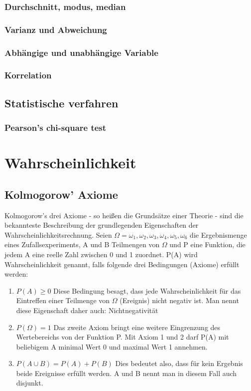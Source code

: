\documentclass[letterpaper, titlepage]{article}
\begin{document}
\subsubsection{Durchschnitt, modus, median}
\subsubsection{Varianz und Abweichung}\label{Varianz und Abweichung}
\subsubsection{Abhängige und unabhängige Variable}\label{Abhängige und unabhängige Variable}
\subsubsection{Korrelation}\label{Korrelation}
\subsection{Statistische verfahren}\label{Statistische verfahren}
\subsubsection{Pearson's chi-square test}\label{Pearson's chi-square test}
\section{Wahrscheinlichkeit}\label{Wahrscheinlichkeit}
\subsection{Kolmogorow' Axiome}\label{Kolmogorow's Axiome}
Kolmogorow's drei Axiome - so heißen die Grundsätze einer Theorie - sind die bekannteste Beschreibung der grundlegenden Eigenschaften der Wahrscheinlichkeitsrechnung. Seien $\Omega={\omega_1, \omega_2, \omega_3, \omega_4, \omega_5, \omega_6}$ die Ergebnismenge eines Zufallsexperiments, A und B Teilmengen von $\Omega$ und P eine Funktion, die jedem A eine reelle Zahl zwischen 0 und 1 zuordnet. P(A) wird Wahrscheinlichkeit genannt, falls folgende drei Bedingungen (Axiome) erfüllt werden:
\begin{enumerate}
    \item $P(A)\geq0$ Diese Bedingung besagt, dass jede Wahrscheinlichkeit für das Eintreffen einer Teilmenge von $\Omega$ (Ereignis) nicht negativ ist. Man nennt diese Eigenschaft daher auch: Nichtnegativität
    \item $P(\Omega)=1$ Das zweite Axiom bringt eine weitere Eingrenzung des Wertebereichs von der Funktion P. Mit Axiom 1 und 2 darf P(A) mit beliebigem A minimal Wert 0 und maximal Wert 1 annehmen.
    \item $P(A \cup B)=P(A)+P(B)$ Dies bedeutet also, dass für kein Ergebnis beide Ereignisse erfüllt werden. A und B nennt man in diesem Fall auch disjunkt.
\end{enumerate}
\end{document}
